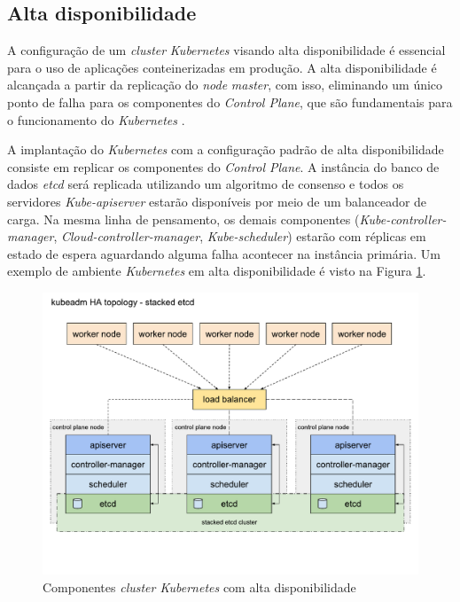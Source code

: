 
\subsection{Alta disponibilidade}
A configuração de um \textit{cluster} \textit{Kubernetes} visando alta disponibilidade é essencial para o uso de aplicações conteinerizadas em produção. A alta disponibilidade é alcançada a partir da replicação do \textit{node} \textit{master}, com isso, eliminando um único ponto de falha para os componentes do \textit{Control Plane}, que são fundamentais para o funcionamento do \textit{Kubernetes} \cite{Kubeha}.

A implantação do \textit{Kubernetes} com a configuração padrão de alta disponibilidade consiste em replicar os componentes do \textit{Control Plane}. A instância do banco de dados \textit{etcd} será replicada utilizando um algoritmo de consenso e todos os servidores \textit{Kube-apiserver} estarão disponíveis por meio de um balanceador de carga. Na mesma linha de pensamento, os demais componentes (\textit{Kube-controller-manager}, \textit{Cloud-controller-manager}, \textit{Kube-scheduler}) estarão com réplicas em estado de espera aguardando alguma falha acontecer na instância primária. Um exemplo de ambiente \textit{Kubernetes} em alta disponibilidade é visto na Figura \ref{fig:components_of_kubernetes_ha}.


\begin{figure}[h!]
	\caption{\label{fig:components_of_kubernetes_ha}Componentes \textit{cluster Kubernetes} com alta disponibilidade}
	\centering
	\includegraphics[width=.84\linewidth]{assets/components-of-kubernetes-ha.pdf}
\end{figure}

